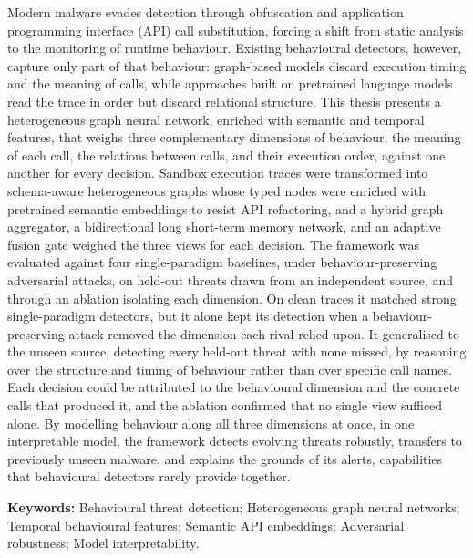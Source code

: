 \documentclass[%
    BCOR=10mm,
    DIV=13,
    toc=bibliography,
    toc=listof,
    oneside,
    12pt,
]{scrbook}
\let\cleardoublepage\clearpage
\begin{document}
\noindent
Modern malware evades detection through obfuscation and application programming
interface (API) call substitution, forcing a shift from static analysis to the
monitoring of runtime behaviour. Existing behavioural detectors, however,
capture only part of that behaviour: graph-based models discard execution
timing and the meaning of calls, while approaches built on pretrained language
models read the trace in order but discard relational structure. This thesis
presents a heterogeneous graph neural network, enriched with semantic and
temporal features, that weighs three complementary dimensions of behaviour, the
meaning of each call, the relations between calls, and their execution order,
against one another for every decision. Sandbox execution traces were
transformed into schema-aware heterogeneous graphs whose typed nodes were
enriched with pretrained semantic embeddings to resist API refactoring, and a
hybrid graph aggregator, a bidirectional long short-term memory network, and an
adaptive fusion gate weighed the three views for each decision. The framework
was evaluated against four single-paradigm baselines, under
behaviour-preserving adversarial attacks, on held-out threats drawn from an
independent source, and through an ablation isolating each dimension. On clean
traces it matched strong single-paradigm detectors, but it alone kept its
detection when a behaviour-preserving attack removed the dimension each rival
relied upon. It generalised to the unseen source, detecting every held-out
threat with none missed, by reasoning over the structure and timing of
behaviour rather than over specific call names. Each decision could be
attributed to the behavioural dimension and the concrete calls that produced
it, and the ablation confirmed that no single view sufficed alone. By modelling
behaviour along all three dimensions at once, in one interpretable model, the
framework detects evolving threats robustly, transfers to previously unseen
malware, and explains the grounds of its alerts, capabilities that behavioural
detectors rarely provide together.

\vspace{1em}
\noindent\textbf{Keywords:} Behavioural threat detection; Heterogeneous graph neural
networks; Temporal behavioural features; Semantic API embeddings; Adversarial robustness;
Model interpretability.

\begingroup
{}
\tableofcontents
\endgroup
\begingroup
{}
\listoffigures
\medskip
\begingroup\let\clearpage\relax\let\cleardoublepage\relax
\listoftables
\endgroup
\endgroup
\newpage
\end{document}
